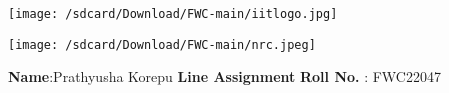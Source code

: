 \documentclass[10pt,a4paper]{report}
\begin{document}
\begin{figure*}[!tbp]
  \centering
  \begin{minipage}[b]{0.4\textwidth}
   \texttt{[image: /sdcard/Download/FWC-main/iitlogo.jpg]} 
  \end{minipage}
  \hfill
  \vspace{5mm}\begin{minipage}[b]{0.4\textwidth}
\raggedleft \texttt{[image: /sdcard/Download/FWC-main/nrc.jpeg]} 

  \end{minipage}\vspace{0.2cm}
\end{figure*}
\raggedright \textbf{Name}:\hspace{1mm}Prathyusha Korepu\hspace{3cm} \Large \textbf{Line Assignment}\hspace{2.5cm} %
\normalsize \textbf{Roll No.} :\hspace{1mm} FWC22047\vspace{1cm}
\end{document}
